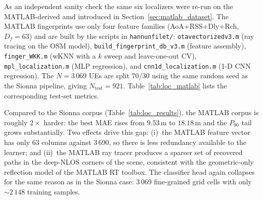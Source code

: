 As an independent sanity check the same six localizers were re-run on the
MATLAB-derived amd introduced in
Section~\ref{sec:matlab_dataset}.
The MATLAB fingerprints use only four feature families
(AoA+RSS+Dly+Rch, $D_f = 63$) and are built by the scripts in
\texttt{hannunfilet/}: \texttt{otavectorizedv3.m} (ray tracing on the
OSM model), \texttt{build\_fingerprint\_db\_v3.m} (feature assembly),
\texttt{finger\_WKK.m} (wKNN with a $k$ sweep and leave-one-out CV),
\texttt{mpl\_localization.m} (MLP regression), and
\texttt{cnn1d\_localization.m} (1-D CNN regression).
The $N = 3\,069$ UEs are split 70/30 using the same random seed as the
Sionna pipeline, giving $N_{\mathrm{test}} = 921$.
Table~\ref{tab:loc_matlab} lists the corresponding test-set metrics.

\begin{table}[htbp]
\caption{Fingerprint-localization test performance on the MATLAB ($N_{\mathrm{test}} = 921$, $D_f = 63$).}
\label{tab:loc_matlab}
\centering
{}
\end{table}

Compared to the Sionna corpus (Table~\ref{tab:loc_results}), the MATLAB
corpus is roughly $2\times$ harder: the best MAE rises from
$9.53\,\text{m}$ to $18.18\,\text{m}$ and the $P_{90}$ tail grows
substantially.
Two effects drive this gap: (i)~the MATLAB feature vector has only 63
columns against 3\,690, so there is less redundancy available to the
learner; and (ii)~the MATLAB ray tracer produces a sparser set of
recovered paths in the deep-NLOS corners of the scene, consistent with
the geometric-only reflection model of the MATLAB RT toolbox.
The classifier head again collapses for the same reason as in the
Sionna case: 3\,069 fine-grained grid cells with only $\sim\!2\,148$
training samples.


